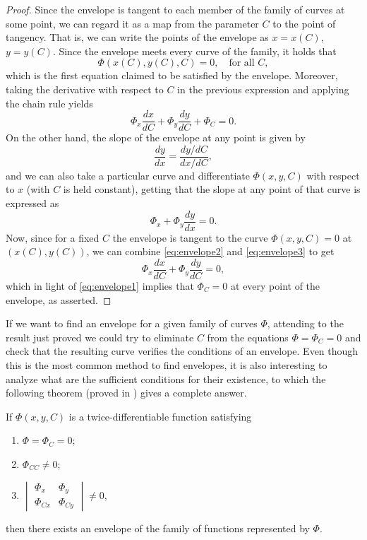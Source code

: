 \begin{proof}
Since the envelope is tangent to each member of the family of curves at some point, we can regard it as a map from the parameter $C$ to the point of tangency. That is, we can write the points of the envelope as $x=x(C)$, $y=y(C)$. Since the envelope meets every curve of the family, it holds that
 \[
\Phi(x(C),y(C),C)=0, \quad \text{for all } C,
 \]
which is the first equation claimed to be satisfied by the envelope. Moreover, taking the derivative with respect to $C$ in the previous expression and applying the chain rule yields
\begin{equation} \label{eq:envelope1}
  \Phi_x \frac{dx}{dC} + \Phi_y \frac{dy}{dC} + \Phi_C = 0.
\end{equation}
 On the other hand, the slope of the envelope at any point is given by
 \begin{equation} \label{eq:envelope2}
   \frac{dy}{dx} = \frac{dy/dC}{dx/dC},
 \end{equation}
and we can also take a particular curve and differentiate $\Phi(x,y,C)$ with respect to $x$ (with $C$ is held constant), getting that the slope at any point of that curve is expressed as
\begin{equation} \label{eq:envelope3}
\Phi_x + \Phi_y \frac{dy}{dx} = 0.
\end{equation}
Now, since for a fixed $C$ the envelope is tangent to the curve $\Phi(x,y,C)=0$ at $(x(C),y(C))$, we can combine \eqref{eq:envelope2} and \eqref{eq:envelope3} to get
\[
\Phi_x \frac{dx}{dC} + \Phi_y \frac{dy}{dC} = 0,
\]
which in light of \eqref{eq:envelope1} implies that $\Phi_C=0$ at every point of the envelope, as asserted.
\end{proof}

If we want to find an envelope for a given family of curves $\Phi$, attending to the result just proved we could try to eliminate $C$ from the equations $\Phi=\Phi_C=0$ and check that the resulting curve verifies the conditions of an envelope. Even though this is the most common method to find envelopes, it is also interesting to analyze what are the sufficient conditions for their existence, to which the following theorem (proved in \cite[10]{burns1961envelopes}) gives a complete answer.

\begin{theorem} \label{th:sufficient} If $\Phi(x,y,C)$ is a twice-differentiable function satisfying
  \begin{enumerate}
    \item $\Phi=\Phi_C=0$;
    \item $\Phi_{CC}\neq 0$;
    \item $\begin{vmatrix} \Phi_x & \Phi_y\\
                    \Phi_{Cx} & \Phi_{Cy}\end{vmatrix} \neq 0$,
  \end{enumerate}
  then there exists an envelope of the family of functions represented by $\Phi$.

\end{theorem}

